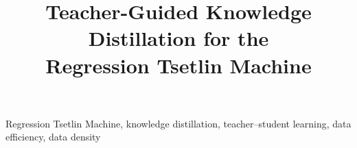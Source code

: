\documentclass[conference]{IEEEtran}
\begin{document}
\title{Teacher-Guided Knowledge Distillation for the\\
Regression Tsetlin Machine}

\author{
}

\maketitle

\begin{abstract}

\end{abstract}

\begin{IEEEkeywords}
Regression Tsetlin Machine, knowledge distillation, teacher--student learning,
data efficiency, data density
\end{IEEEkeywords}
















\end{document}
